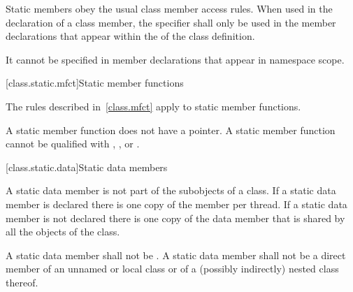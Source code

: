 \pnum
Static members obey the usual class member access rules.
When used in the declaration of a class
member, the  specifier shall only be used in the member
declarations that appear within the  of
the class definition.
\begin{note}
It cannot be specified in member declarations that appear in namespace scope.
\end{note}

[class.static.mfct]{Static member functions}
%

\pnum
\begin{note}
The rules described in~\ref{class.mfct} apply to static member
functions.
\end{note}

\pnum
\begin{note}
A static member function does not have a 
pointer.
A static member function cannot be qualified with ,
, or .
\end{note}

[class.static.data]{Static data members}
%

\pnum
A static data member is not part of the subobjects of a class. If a
static data member is declared  there is one copy of
the member per thread. If a static data member is not declared
 there is one copy of the data member that is shared by all
the objects of the class.

\pnum
A static data member shall not be .
A static data member shall not be a direct member
of an unnamed or local class or
of a (possibly indirectly) nested class thereof.

